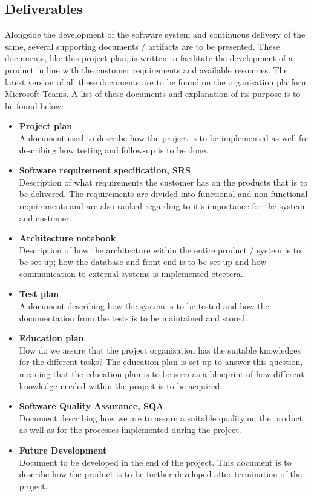 \subsection{Deliverables}
Alongside the development of the software system and continuous delivery of the same, several supporting documents / artifacts are to be presented. These documents, like this project plan, is written to facilitate the development of a product in line with the customer requirements and available resources. The latest version of all these documents are to be found on the organisation platform Microsoft Teams. A list of these documents and explanation of its purpose is to be found below:
\begin{itemize}
    \item{\textbf{Project plan}} \\
    A document used to describe how the project is to be implemented as well for describing how testing and follow-up is to be done. 
    \item{\textbf{Software requirement specification, SRS}} \\
    Description of what requirements the customer has on the products that is to be delivered. The requirements are divided into functional and non-functional requirements and are also ranked regarding to it's importance for the system and customer. 
    \item{\textbf{Architecture notebook}} \\
    Description of how the architecture within the entire product / system is to be set up; how the database and front end is to be set up and how communication to external systems is implemented etcetera.  
    \item{\textbf{Test plan}} \\
    A document describing how the system is to be tested and how the documentation from the tests is to be maintained and stored. 
    \item{\textbf{Education plan}} \\
    How do we assure that the project organisation has the suitable knowledges for the different tasks? The education plan is set up to answer this question, meaning that the education plan is to be seen as a blueprint of how different knowledge needed within the project is to be acquired. 
    \item{\textbf{Software Quality Assurance, SQA}} \\
    Document describing how we are to assure a suitable quality on the product as well as for the processes implemented during the project. 
    \item{\textbf{Future Development}} \\
    Document to be developed in the end of the project. This document is to describe how the product is to be further developed after termination of the project. 
\end{itemize}
